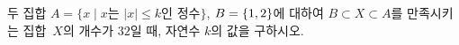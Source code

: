 두 집합 $A=\{x \mid x$는 $|x|\le k$인 정수$\}$, $B=\{1{,}\mkern3mu\mathopen{}2\}$에 대하여 $B\subset X\subset A$를 만족시키는 집합~$X$의 개수가 $32$일 때, 자연수 $k$의 값을 구하시오.
